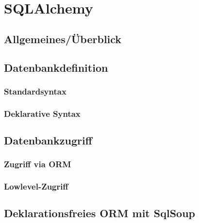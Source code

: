 \chapter{SQLAlchemy}

\section{Allgemeines/Überblick}

\section{Datenbankdefinition}
\subsection{Standardsyntax}
\subsection{Deklarative Syntax}

\section{Datenbankzugriff}
\subsection{Zugriff via ORM}
\subsection{Lowlevel-Zugriff}

\section{Deklarationsfreies ORM mit SqlSoup}

